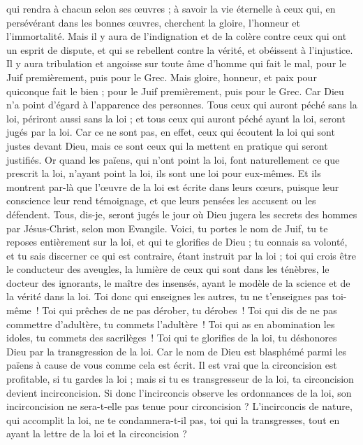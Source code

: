 \begin{multicols}{2}
qui rendra à chacun selon ses œuvres ;
à savoir la vie éternelle à ceux qui, en persévérant dans les bonnes œuvres, cherchent la gloire, l'honneur et l'immortalité.
Mais il y aura de l'indignation et de la colère contre ceux qui ont un esprit de dispute, et qui se rebellent contre la vérité, et obéissent à l'injustice.
Il y aura tribulation et angoisse sur toute âme d'homme qui fait le mal, pour le Juif premièrement, puis pour le Grec.
Mais gloire, honneur, et paix pour quiconque fait le bien ; pour le Juif premièrement, puis pour le Grec.
Car Dieu n'a point d'égard à l'apparence des personnes.
Tous ceux qui auront péché sans la loi, périront aussi sans la loi ; et tous ceux qui auront péché ayant la loi, seront jugés par la loi.
Car ce ne sont pas, en effet, ceux qui écoutent la loi qui sont justes devant Dieu, mais ce sont ceux qui la mettent en pratique qui seront justifiés.
Or quand les païens, qui n'ont point la loi, font naturellement ce que prescrit la loi, n'ayant point la loi, ils sont une loi pour eux-mêmes.
Et ils montrent par-là que l’œuvre de la loi est écrite dans leurs cœurs, puisque leur conscience leur rend témoignage, et que leurs pensées les accusent ou les défendent.
Tous, dis-je, seront jugés le jour où Dieu jugera les secrets des hommes par Jésus-Christ, selon mon Evangile.
Voici, tu portes le nom de Juif, tu te reposes entièrement sur la loi, et qui te glorifies de Dieu ;
tu connais sa volonté, et tu sais discerner ce qui est contraire, étant instruit par la loi ; toi qui crois être le conducteur des aveugles, la lumière de ceux qui sont dans les ténèbres,
le docteur des ignorants, le maître des insensés, ayant le modèle de la science et de la vérité dans la loi.
Toi donc qui enseignes les autres, tu ne t’enseignes pas toi-même ! Toi qui prêches de ne pas dérober, tu dérobes !
Toi qui dis de ne pas commettre d’adultère, tu commets l’adultère ! Toi qui as en abomination les idoles, tu commets des sacrilèges !
Toi qui te glorifies de la loi, tu déshonores Dieu par la transgression de la loi.
Car le nom de Dieu est blasphémé parmi les païens à cause de vous comme cela est écrit.
Il est vrai que la circoncision est profitable, si tu gardes la loi ; mais si tu es transgresseur de la loi, ta circoncision devient incirconcision.
Si donc l’incirconcis observe les ordonnances de la loi, son incirconcision ne sera-t-elle pas tenue pour circoncision ?
L’incirconcis de nature, qui accomplit la loi, ne te condamnera-t-il pas, toi qui la transgresses, tout en ayant la lettre de la loi et la circoncision ?

\end{multicols}
